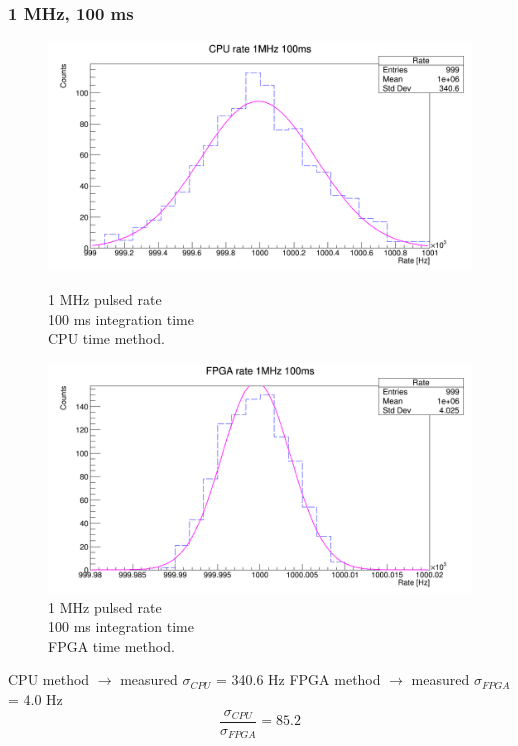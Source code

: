 \subsubsection{1 MHz, 100 ms}
\begin{figure}[H]
	\centering
	\begin{minipage}{0.49\textwidth}
		\centering
		\includegraphics[width=.95\linewidth]{IMG/ch5/RateMeasures/CPU-time-rate-1MHz-100ms}
		\caption{1 MHz pulsed rate\\100 ms integration time\\CPU time method.}
		\label{fig:CPU-time-rate-1MHz-100ms}
	\end{minipage}%
	\begin{minipage}{0.49\textwidth}
		\centering
		\includegraphics[width=.95\linewidth]{IMG/ch5/RateMeasures/FPGA-time-rate-1MHz-100ms}
		\caption{1 MHz pulsed rate\\100 ms integration time\\FPGA time method.}
		\label{fig:FPGA-time-rate-1MHz-100ms}
	\end{minipage}
\end{figure}
\noindent CPU method $\rightarrow$ measured $\sigma_{CPU}$ = 340.6 Hz
\newline
FPGA method $\rightarrow$ measured $\sigma_{FPGA}$ = 4.0 Hz
\begin{equation}
	\frac{\sigma_{CPU}}{\sigma_{FPGA}} = 85.2
\end{equation}


